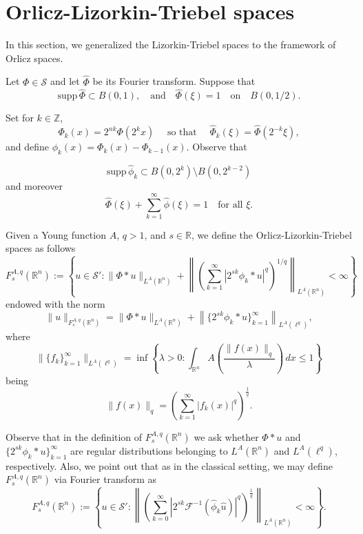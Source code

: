 \documentclass[leqno,twoside, 12pt]{amsart}
\theoremstyle{plain}
\numberwithin{equation}{section} \numberwithin{figure}{section}
\theoremstyle{definition}
\newcommand{\R}{\mathbb R}
\numberwithin{equation}{section}
\begin{document}
\section{Orlicz-Lizorkin-Triebel spaces} \label{sec.lt}

In this section, we generalized the Lizorkin-Triebel spaces to the framework of Orlicz spaces.



Let $\Phi \in \mathcal{S}$ and let $\hat \Phi$ be its Fourier transform. Suppose that
$$\text{supp}\,\hat \Phi \subset B(0, 1), \quad \text{and}\quad \hat \Phi(\xi)=1 \quad \text{on} \quad B(0, 1/2).$$

 Set for $k\in \mathbb{Z}$,
$$
\Phi_k (x)=2^{nk}\Phi(2^k x) \quad \text{ so that } \quad \hat \Phi_k(\xi)=\hat\Phi(2^{-k}\xi),
$$
and define $\phi_k(x)=\Phi_k(x)-\Phi_{k-1}(x)$. Observe that

$$\text{supp}\,\hat \phi_k \subset B(0, 2^{k})\setminus B(0, 2^{k-2})$$and moreover
$$\hat \Phi (\xi) +\sum_{k=1}^\infty \hat \phi(\xi)=1 \quad \text{for all }\xi.$$


 Given a Young function $A$, $q>1$, and $s\in \R$, we define the Orlicz-Lizorkin-Triebel spaces as follows
$$
F_s^{A,q}(\R^n):=\left\{u\in \mathcal{S}'\colon \|\Phi*u\|_{L^A(\R^n)} + \left\| \left( \sum_{k=1}^\infty |2^{s k}\phi_k* u|^q\right)^{1/q} \right\|_{L^A(\R^n)}<\infty \right\}
$$
 endowed with the norm
$$
\|u\|_{F_s^{A,q}(\R^n)}=\|\Phi*u\|_{L^A(\R^n)} + \left\|\{2^{s k}\phi_k*u\}_{k=1}^\infty \right\|_{L^A(\ell^q)},
$$ 
where
$$
\|\{f_k\}_{k=1}^\infty\|_{L^A(\ell^q)} =\inf\left\{\lambda>0 \colon \int_{\R^n} A\left(\frac{\|f(x)\|_q}{\lambda} \right)\,dx\leq 1 \right\}
$$
being
$$
\|f(x)\|_q = \left(\sum_{k=1}^\infty |f_k(x)|^q\right)^\frac1q.
$$

Observe that in the definition of $F_s^{A, q}(\R^n)$ we ask whether $\Phi*u$ and  $\{2^{s k}\phi_k*u\}_{k=1}^\infty $ are regular distributions belonging to $L^A(\R^n)$ and $L^A(\ell^q)$, respectively. Also, we point out that as in the classical setting, we may define $F_s^{A,q}(\R^n)$ via Fourier transform as
\begin{equation}\label{alternative LT}
F_s^{A,q}(\R^n):=\left\{u\in \mathcal{S}'\colon \left\| \left( \sum_{k=0}^\infty |2^{s k}\mathcal{F}^{-1}(\hat \phi_k \hat u)|^q\right)^\frac1q \right\|_{L^A(\R^n)}<\infty \right\}.
\end{equation}



\end{document}
